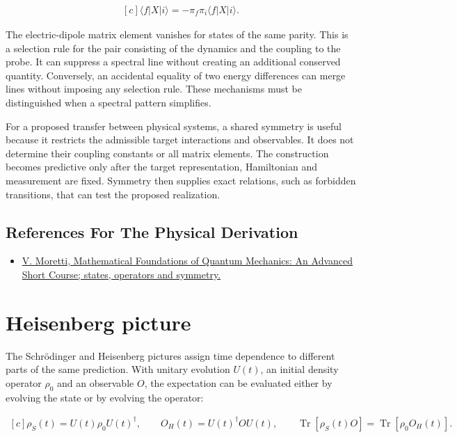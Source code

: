 \documentclass[11pt,oneside]{book}
\newenvironment{centeredalign}{\[\begin{gathered}[c]}{\end{gathered}\]}
\begin{document}
\begin{centeredalign}
\langle f|X|i\rangle=-\pi_f\pi_i\langle f|X|i\rangle.
\end{centeredalign}

The electric-dipole matrix element vanishes for states of the same parity. This is a selection rule for the pair consisting of the dynamics and the coupling to the probe. It can suppress a spectral line without creating an additional conserved quantity. Conversely, an accidental equality of two energy differences can merge lines without imposing any selection rule. These mechanisms must be distinguished when a spectral pattern simplifies.

For a proposed transfer between physical systems, a shared symmetry is useful because it restricts the admissible target interactions and observables. It does not determine their coupling constants or all matrix elements. The construction becomes predictive only after the target representation, Hamiltonian and measurement are fixed. Symmetry then supplies exact relations, such as forbidden transitions, that can test the proposed realization.

\subsection*{References For The Physical Derivation}
\begin{itemize}
\item \href{https://arxiv.org/abs/1508.06951}{V. Moretti, Mathematical Foundations of Quantum Mechanics: An Advanced Short Course; states, operators and symmetry.}
\end{itemize}





\clearpage

\section{Heisenberg picture}

\label{topic:heisenberg-picture}

The Schrödinger and Heisenberg pictures assign time dependence to different parts of the same prediction. With unitary evolution \(U(t)\), an initial density operator \(\rho_0\) and an observable \(O\), the expectation can be evaluated either by evolving the state or by evolving the operator:

\begin{centeredalign}
\rho_S(t)=U(t)\rho_0U(t)^\dagger,\qquad
O_H(t)=U(t)^\dagger OU(t),\qquad
\operatorname{Tr}[\rho_S(t)O]=\operatorname{Tr}[\rho_0O_H(t)].
\end{centeredalign}
\end{document}
